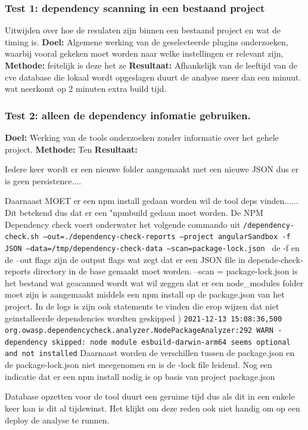 \subsubsection{Test 1: dependency scanning in een bestaand project}
Uitwijden over hoe de resulaten zijn binnen een bestaand project en wat de timing is.
\textbf{Doel:} Algemene werking van de geselecteerde plugins onderzoeken, waarbij vooral gekeken moet worden naar welke instellingen er relevant zijn,
\textbf{Methode:} feitelijk is deze het ze
\textbf{Resultaat:} Afhankelijk van de leeftijd van de cve database die lokaal wordt opgeslagen duurt de analyse meer dan een minuut. wat neerkomt op 2 minuten extra build tijd.

\subsubsection{Test 2: alleen de dependency infomatie gebruiken.}



\textbf{Doel:} Werking van de tools onderzoeken zonder informatie over het gehele project.
\textbf{Methode:} Ten
\textbf{Resultaat:}

Iedere keer wordt er een nieuwe folder aangemaakt met een nieuwe JSON dus er is geen persistence....

Daarnaast MOET er een npm install gedaan worden wil de tool deps vinden...... Dit betekend dus dat er een "npmbuild gedaan moet worden.
De NPM Dependency check voert onderwater het volgende commando uit \texttt{/dependency-check.sh --out=./dependency-check-reports --project angularSandbox -f JSON --data=/tmp/dependency-check-data --scan=package-lock.json
} de -f en de --out flags zijn de output flags wat zegt dat er een JSON file in depende-check-reports directory in de base gemaakt moet worden. --scan = package-lock.json is het bestand wat geacanned wordt wat wil zeggen dat er een node_modules folder moet zijn is aangemaakt middels een npm install op de package.json van het project. In de logs is zijn ook statements te vinden die erop wijzen dat niet geinstalleerde dependencies wordten geskipped ) \texttt{2021-12-13 15:08:36,500 org.owasp.dependencycheck.analyzer.NodePackageAnalyzer:292
WARN  - dependency skipped: node module esbuild-darwin-arm64 seems optional and not installed} Daarnaast worden de verschillen tussen de package.json en de package-lock.json niet meegenomen en is de -lock file leidend. Nog een indicatie dat er een npm install nodig is op basis van project package.json


Database opzetten voor de tool duurt een geruime tijd dus als dit in een enkele keer kan is dit al tijdswinst. Het klijkt om deze reden ook niet handig om op een deploy de analyse te runnen.


